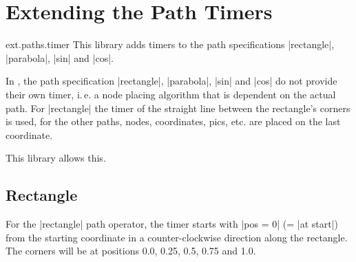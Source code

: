 %
%
%

\section{Extending the Path Timers}
\label{library:timer}

\begin{tikzlibrary}{ext.paths.timer}
  This library adds timers to the path specifications |rectangle|, |parabola|, |sin| and |cos|.
  
\end{tikzlibrary}

In \tikzname, the path specification |rectangle|, |parabola|, |sin| and |cos| do not provide
their own timer, i.\,e. a node placing algorithm that is dependent on the actual path.
For |rectangle| the timer of the straight line between the rectangle's corners is used, for
the other paths, nodes, coordinates, pics, etc. are placed on the last coordinate.

This library allows this.

\subsection{Rectangle}

For the |rectangle| path operator, the timer starts with |pos = 0| (= |at start|) from
the starting coordinate in a counter-clockwise direction along the rectangle.
The corners will be at positions 0.0, 0.25, 0.5, 0.75 and 1.0.

\begin{codeexample}[width=10cm,preamble=\usetikzlibrary{ext.paths.timer}]
\end{codeexample}

